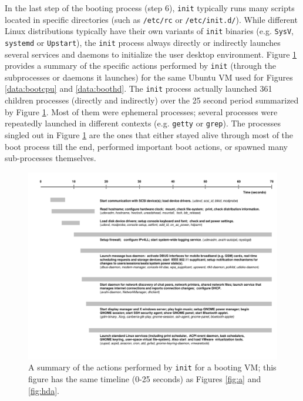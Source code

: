 In the last step of the booting
process (step 6), \texttt{init} typically
runs many scripts located in 
specific directories (such as \texttt{/etc/rc}
or \texttt{/etc/init.d/}). While different Linux distributions
typically have their own variants of \texttt{init} binaries
(e.g. \texttt{SysV}, \texttt{systemd} or \texttt{Upstart}),
the \texttt{init} process always directly or indirectly launches several 
services and daemons to initialize the user desktop
environment. Figure \ref{boot:services} provides a
summary of the specific actions performed by \texttt{init} 
(through the subprocesses or daemons it launches)
for the same Ubuntu VM used for 
Figures \ref{data:bootcpu} and \ref{data:boothd}.
The \texttt{init} process actually launched 361 children processes (directly
and indirectly) over the 25 second period summarized by Figure \ref{boot:services}.
Most of them were ephemeral processes; several processes were repeatedly launched
in different contexts (e.g. \texttt{getty} or \texttt{grep}). The processes singled out
in Figure \ref{boot:services} are the ones that either 
stayed alive through most of the boot process till the end, performed important
boot actions, or spawned many sub-processes themselves.

\begin{figure}[]
  \center
  \includegraphics[width=1.0\textwidth, trim=0.5cm 1cm 1cm 1cm]{boottimeline.pdf}
  \caption[A summary of the actions performed by \texttt{init} for a booting VM]%
  {A summary of the actions performed by \texttt{init} for a booting VM;
  this figure has the same timeline (0-25 seconds) as Figures \ref{fig:a} and 
  \ref{fig:hda}.}
  \label{boot:services}
\end{figure}


